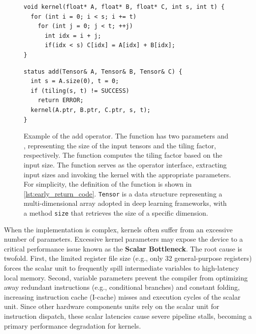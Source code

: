 \begin{figure}[htbp]
    \centering
    \begin{minipage}{0.48\textwidth}
    \begin{lstlisting}[basicstyle=\ttfamily\footnotesize, frame=single]
void kernel(float* A, float* B, float* C, int s, int t) {
  for (int i = 0; i < s; i += t)
    for (int j = 0; j < t; ++j)
      int idx = i + j;
      if(idx < s) C[idx] = A[idx] + B[idx];
}
    \end{lstlisting}
    \end{minipage}
\hfill
    \begin{minipage}{0.48\textwidth}
    \begin{lstlisting}[basicstyle=\ttfamily\footnotesize, frame=single, firstnumber=7]
status add(Tensor& A, Tensor& B, Tensor& C) {
  int s = A.size(0), t = 0;
  if (tiling(s, t) != SUCCESS) 
    return ERROR;
  kernel(A.ptr, B.ptr, C.ptr, s, t);
}
    \end{lstlisting}
    \end{minipage}
    \caption{Example of the add operator. The  function has two parameters  and , representing the size of the input tensors and the tiling factor, respectively. 
    The  function computes the tiling factor based on the input size. The  function serves as the operator interface, extracting input sizes and invoking the kernel with the appropriate parameters. 
    For simplicity, the definition of the  function is shown in \autoref{lst:early_return_code}. 
    \texttt{Tensor} is a data structure representing a multi-dimensional array adopted in deep learning frameworks, with a method \texttt{size} that retrieves the size of a specific dimension.}
    \label{lst:add_kernel_with_formal_param}
\end{figure}


When the implementation is complex, kernels often suffer from an excessive number of parameters.
Excessive kernel parameters may expose the device to a critical performance issue known as the \textbf{Scalar Bottleneck}.
The root cause is twofold.
First, the limited register file size (e.g., only 32 general-purpose registers) forces the scalar unit to frequently spill intermediate variables to high-latency local memory.
Second, variable parameters prevent the compiler from optimizing away redundant instructions (e.g., conditional branches) and constant folding, increasing instruction cache (I-cache) misses and execution cycles of the scalar unit.
Since other hardware components units rely on the scalar unit for instruction dispatch, these scalar latencies cause severe pipeline stalls, becoming a primary performance degradation for kernels.

